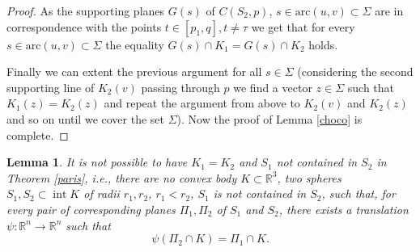 \documentclass[12pt]{amsart}
\newcommand{\inte}{\operatorname*{int}}
\newtheorem{lemma}{Lemma}
\begin{document}
\begin{proof}
As the supporting planes $G(s)$ of $C(S_2,p)$, $s\in \textrm{arc} (u,v)\subset \Sigma$ are in correspondence with the points $t\in [p_1,q], t\not=\tau$ we get that for every $s\in \textrm{arc} (u,v)\subset \Sigma$ the equality $G(s)\cap K_1=G(s)\cap K_2$ holds. 

Finally we can extent the previous argument for all $s\in \Sigma$ 
(considering the second supporting line of $ K_2(v)$ passing through $p$ we find a vector $z\in \Sigma$ such that $  K_1(z)= K_2(z)$ and repeat the argument from above to $ K_2(v)$ and $ K_2(z)$ and so on until we cover the set $\Sigma$). Now the proof of Lemma \ref{choco} is complete.  
\end{proof}
\begin{lemma}\label{ade}
It is not possible to have $K_1=K_2$ and $S_1$ not contained in $S_2$ in Theorem \ref{paris}, i.e., there are no convex body $K\subset \mathbb{R}^{3}$, two spheres $S_1,S_2\subset \inte K$ of radii $r_1, r_2$, $r_1<r_2$, $S_1$ is not contained in $S_2$, such that, for every pair of corresponding planes $\Pi_1, \Pi_2$ of $S_1$ and $S_2$, there exists a translation $\psi: \mathbb{R}^{n} \rightarrow \mathbb{R}^{n}$ such that
\[
\psi(\Pi_2\cap K) = \Pi_1\cap K.
\]	 
\end{lemma}
\end{document}
